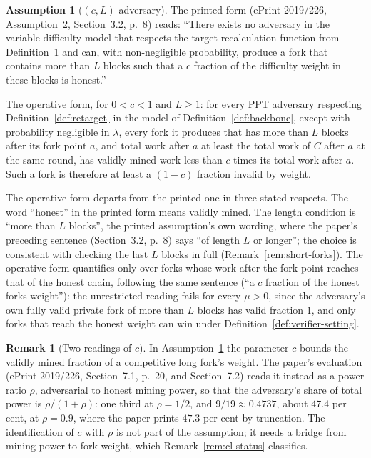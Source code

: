 \documentclass[11pt,a4paper]{article}
\theoremstyle{definition}
\newtheorem{assumption}[theorem]{Assumption}
\newtheorem{remark}[theorem]{Remark}
\begin{document}
\begin{assumption}[$(c, L)$-adversary]\label{ass:cl}
The printed form (ePrint 2019/226, Assumption~2, Section~3.2, p.~8) reads:
``There exists no adversary in the variable-difficulty model that respects
the target recalculation function from Definition~1 and can, with
non-negligible probability, produce a fork that contains more than $L$
blocks such that a $c$ fraction of the difficulty weight in these blocks is
honest.''

The operative form, for $0 < c < 1$ and $L \ge 1$: for every PPT adversary
respecting Definition~\ref{def:retarget} in the model of
Definition~\ref{def:backbone}, except with probability negligible in
$\lambda$, every fork it produces that has more than $L$ blocks after its
fork point $a$, and total work after $a$ at least the total work of $C$
after $a$ at the same round, has validly mined work less than $c$ times its
total work after $a$. Such a fork is therefore at least a $(1 - c)$ fraction
invalid by weight.
\end{assumption}

The operative form departs from the printed one in three stated respects.
The word ``honest'' in the printed form means validly mined. The length
condition is ``more than $L$ blocks'', the printed assumption's own wording,
where the paper's preceding sentence (Section~3.2, p.~8) says ``of length
$L$ or longer''; the
choice is consistent with checking the last $L$ blocks in full
(Remark~\ref{rem:short-forks}). The operative form quantifies only over
forks whose work after the fork point reaches that of the honest chain,
following the same sentence (``a $c$ fraction of the honest forks
weight''): the unrestricted reading fails for every $\mu > 0$, since
the adversary's own fully valid private fork of more than $L$ blocks has
valid fraction $1$, and only forks that reach the honest weight can win
under Definition~\ref{def:verifier-setting}.

\begin{remark}[Two readings of $c$]\label{rem:c-readings}
In Assumption~\ref{ass:cl} the parameter $c$ bounds the validly mined
fraction of a competitive long fork's weight. The paper's evaluation
(ePrint 2019/226, Section~7.1, p.~20, and Section~7.2) reads it instead as a
power ratio $\rho$, adversarial to honest mining power, so that the
adversary's share of total power is $\rho / (1 + \rho)$: one third at
$\rho = 1/2$, and $9/19 \approx 0.4737$, about $47.4$ per cent, at
$\rho = 0.9$, where the paper prints $47.3$ per cent by truncation. The
identification of $c$ with $\rho$ is not part of the assumption; it needs a
bridge from mining power to fork weight, which
Remark~\ref{rem:cl-status} classifies.
\end{remark}
\end{document}
